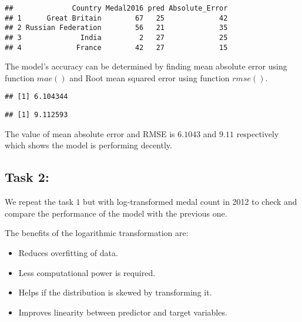 \documentclass[
]{article}
\newenvironment{Shaded}{\begin{snugshade}}{\end{snugshade}}
\newcommand{\CommentTok}[1]{\textcolor[rgb]{0.56,0.35,0.01}{\textit{#1}}}
\newcommand{\FunctionTok}[1]{\textcolor[rgb]{0.00,0.00,0.00}{#1}}
\newcommand{\NormalTok}[1]{#1}
\newcommand{\SpecialCharTok}[1]{\textcolor[rgb]{0.00,0.00,0.00}{#1}}
\providecommand{\tightlist}{%
  \setlength{\itemsep}{0pt}\setlength{\parskip}{0pt}}
\begin{document}
\begin{verbatim}
##              Country Medal2016 pred Absolute_Error
## 1      Great Britain        67   25             42
## 2 Russian Federation        56   21             35
## 3              India         2   27             25
## 4             France        42   27             15
\end{verbatim}

The model's accuracy can be determined by finding mean absolute error
using function \(mae()\) and Root mean squared error using function
\(rmse()\).

\begin{Shaded}
\end{Shaded}

\begin{verbatim}
## [1] 6.104344
\end{verbatim}

\begin{Shaded}
\end{Shaded}

\begin{verbatim}
## [1] 9.112593
\end{verbatim}

The value of mean absolute error and RMSE is \(6.1043\) and \(9.11\)
respectively which shows the model is performing decently.

\hypertarget{task-2}{%
\subsection{Task 2:}\label{task-2}}

We repeat the task \(1\) but with log-transformed medal count in 2012 to
check and compare the performance of the model with the previous one.

The benefits of the logarithmic transformation are:

\begin{itemize}
\tightlist
\item
  Reduces overfitting of data.
\item
  Less computational power is required.
\item
  Helps if the distribution is skewed by transforming it.
\item
  Improves linearity between predictor and target variables.
\end{itemize}
\end{document}
